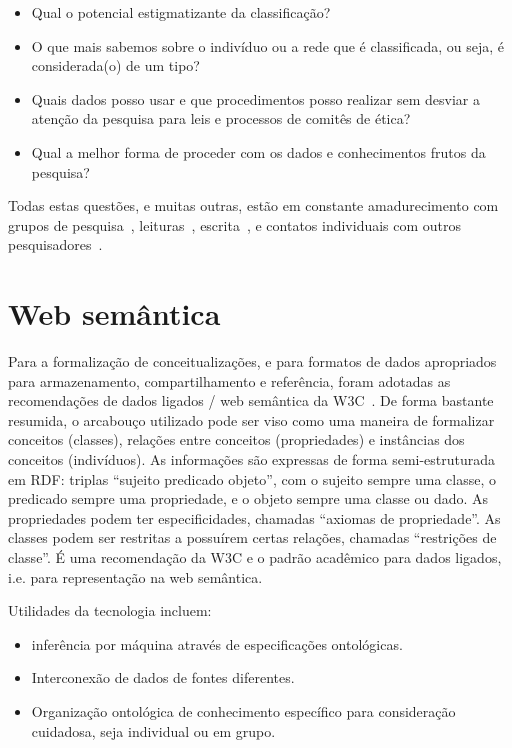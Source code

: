 \documentclass[a4paper,openright,12pt]{report} %
\begin{document}
\begin{itemize}
    \item Qual o potencial estigmatizante da classificação?
    \item O que mais sabemos sobre o indivíduo ou a rede que é classificada, ou seja, é considerada(o) de um tipo?
    \item Quais dados posso usar e que procedimentos posso realizar
        sem desviar a atenção da pesquisa para leis e processos de comitês de ética?
    \item Qual a melhor forma de proceder com os dados e conhecimentos frutos da pesquisa?
\end{itemize}

Todas estas questões, e muitas outras, estão em constante amadurecimento com grupos de pesquisa~\cite{Nexus}, 
leituras~\cite{mas}, escrita~\cite{ensaioAA,ap}, e contatos individuais com outros pesquisadores~\cite{massimoTexto,massimoEncontro}.

\section{Web semântica}\label{sec:web}
Para a formalização de conceitualizações, e
para formatos de dados apropriados para armazenamento,
compartilhamento e referência,
foram adotadas as recomendações de dados ligados / web semântica
da W3C~\cite{rdf,owl,rdfs}.
De forma bastante resumida, o arcabouço utilizado pode
ser viso como uma maneira de formalizar conceitos (classes), relações
entre conceitos (propriedades) e instâncias dos conceitos (indivíduos).
As informações são expressas de forma semi-estruturada em RDF:
triplas ``sujeito predicado objeto'',
com o sujeito sempre uma classe, o predicado sempre uma propriedade,
e o objeto sempre uma classe ou dado. As propriedades podem ter especificidades, chamadas ``axiomas de propriedade''. As classes podem ser restritas a possuírem certas relações, chamadas ``restrições de classe''.
É uma recomendação da W3C e o padrão acadêmico para dados ligados, i.e. para representação na web semântica.

Utilidades da tecnologia incluem:
\begin{itemize}
    \item inferência por máquina através de especificações ontológicas. 
    \item Interconexão de dados de fontes diferentes.
    \item Organização ontológica de conhecimento específico para consideração cuidadosa, seja individual ou em grupo.
\end{itemize}
\end{document}
